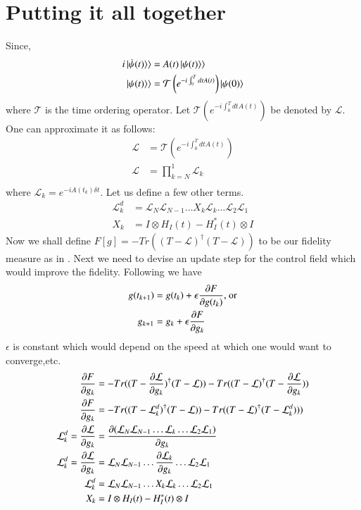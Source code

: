 \section{Putting it all together}
Since,
\begin{align}
    i\ket{\dot{\psi}(t)}\rangle &= A(t)\ket{\psi(t)}\rangle\\
    \ket{\psi(t)}\rangle &= \mathcal{T}\left(e^{-i\int_{0}^{T} dt A(t)} \right)\ket{\psi(0)}
\end{align}
where $\mathcal{T}$ is the time ordering operator.
Let $\mathcal{T}\left(e^{-i\int_{0}^{T} dt A(t)} \right)$ be denoted by $\mathcal{L}$. One can approximate it as follows:
\begin{align}
    \mathcal{L}&=\mathcal{T}\left(e^{-i\int_{0}^{T}dt A(t)}\right)\\
    \mathcal{L}&= \prod_{k = N}^{1} \mathcal{L}_{k}\\
\end{align}
where $\mathcal{L}_{k} = e^{-iA(t_{k})\delta t}$.
Let us define a few other terms.
\begin{align}\label{some_def}
    \mathcal{L}^{d}_{k} &= \mathcal{L}_{N}\mathcal{L}_{N-1}\ldots X_{k} \mathcal{L}_{k}\ldots \mathcal{L}_{2}\mathcal{L}_{1}\\
    X_{k} &= I\otimes H_{I}(t) - H_{I}^{*}(t)\otimes I 
\end{align}
Now we shall define $F[g] = - Tr((T - \mathcal{L})^{\dagger}(T - \mathcal{L}))$ to be our fidelity measure as in \cite{khaneja2005optimal}. Next we need to devise an update step for the control field which would improve the fidelity. Following \cite{khaneja2005optimal} we have 
\begin{align}\label{update_step}
    g(t_{k+1})&= g(t_{k}) + \epsilon\pdv{F}{g(t_{k})} \text{, or}\\
    g_{k+1} &=    g_{k}   + \epsilon\pdv{F}{g_{k}}
\end{align}
$\epsilon$ is  constant which would depend on the speed at which one would want to converge,etc.
\begin{align}
    \pdv{F}{g_{k}}&= -Tr((T - \pdv{\mathcal{L}}{g_{k}})^{\dagger}(T - \mathcal{L})) - Tr((T - \mathcal{L})^{\dagger}(T - \pdv{\mathcal{L}}{g_{k}})) \\
    \pdv{F}{g_{k}}&=  -Tr((T - \mathcal{L}^{d}_{k})^{\dagger}(T - \mathcal{L})) - Tr((T - \mathcal{L})^{\dagger}(T - \mathcal{L}^{d}_{k})))\\
    \mathcal{L}^{d}_{k}=\pdv{\mathcal{L}}{g_{k}} &= \pdv{(\mathcal{L}_{N}\mathcal{L}_{N-1}\ldots  \mathcal{L}_{k}\ldots \mathcal{L}_{2}\mathcal{L}_{1})}{g_{k}}\\
    \mathcal{L}^{d}_{k}=\pdv{\mathcal{L}}{g_{k}} &= \mathcal{L}_{N}\mathcal{L}_{N-1}\ldots \pdv{ \mathcal{L}_{k}}{g_{k}}\ldots \mathcal{L}_{2}\mathcal{L}_{1}\\
    \mathcal{L}^{d}_{k} &= \mathcal{L}_{N}\mathcal{L}_{N-1}\ldots X_{k} \mathcal{L}_{k}\ldots \mathcal{L}_{2}\mathcal{L}_{1}\\
    X_{k} &= I\otimes H_{I}(t) - H_{I}^{*}(t)\otimes I 
\end{align}

